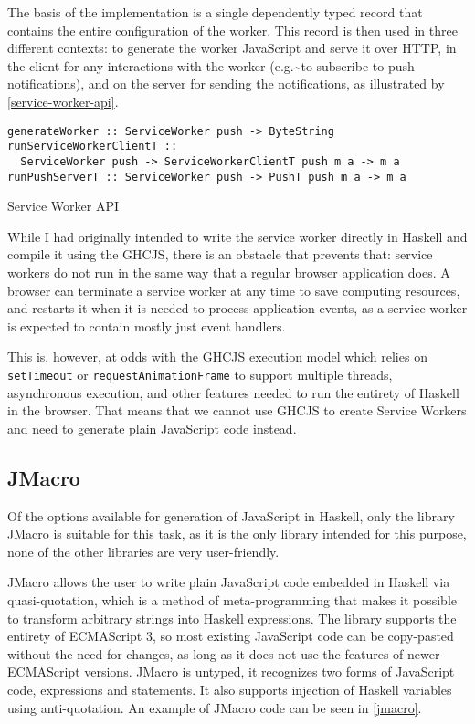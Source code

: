 \documentclass[english,odsaz]{fitthesis}
\begin{document}
The basis of the implementation is a single dependently typed record that
contains the entire configuration of the worker. This record is then used in
three different contexts: to generate the worker JavaScript and serve it over
HTTP, in the client for any interactions with the worker (e.g.\textasciitilde{}to subscribe to
push notifications), and on the server for sending the notifications, as
illustrated by \ref{service-worker-api}.

\begin{listing}[htbp]
\begin{verbatim}
generateWorker :: ServiceWorker push -> ByteString
runServiceWorkerClientT ::
  ServiceWorker push -> ServiceWorkerClientT push m a -> m a
runPushServerT :: ServiceWorker push -> PushT push m a -> m a
\end{verbatim}
\caption{Service Worker API \label{service-worker-api}}
\end{listing}

While I had originally intended to write the service worker directly in Haskell
and compile it using the GHCJS, there is an obstacle that prevents that: service
workers do not run in the same way that a regular browser application does. A
browser can terminate a service worker at any time to save computing resources,
and restarts it when it is needed to process application events, as a service
worker is expected to contain mostly just event handlers.

This is, however, at odds with the GHCJS execution model which relies on
\texttt{setTimeout} or \texttt{requestAnimationFrame} to support multiple threads, asynchronous
execution, and other features needed to run the entirety of Haskell in the
browser. That means that we cannot use GHCJS to create Service Workers and need
to generate plain JavaScript code instead.

\subsection{JMacro}
\label{sec:org4e4aa52}
Of the options available for generation of JavaScript in Haskell, only the
library JMacro is suitable for this task, as it is the only library intended for
this purpose, none of the other libraries are very user-friendly.

JMacro allows the user to write plain JavaScript code embedded in Haskell via
quasi-quotation, which is a method of meta-programming that makes it possible to
transform arbitrary strings into Haskell expressions. The library supports the
entirety of ECMAScript 3, so most existing JavaScript code can be copy-pasted
without the need for changes, as long as it does not use the features of newer
ECMAScript versions. JMacro is untyped, it recognizes two forms of JavaScript
code, expressions and statements. It also supports injection of Haskell
variables using anti-quotation. An example of JMacro code can be seen in \ref{jmacro}.
\end{document}

